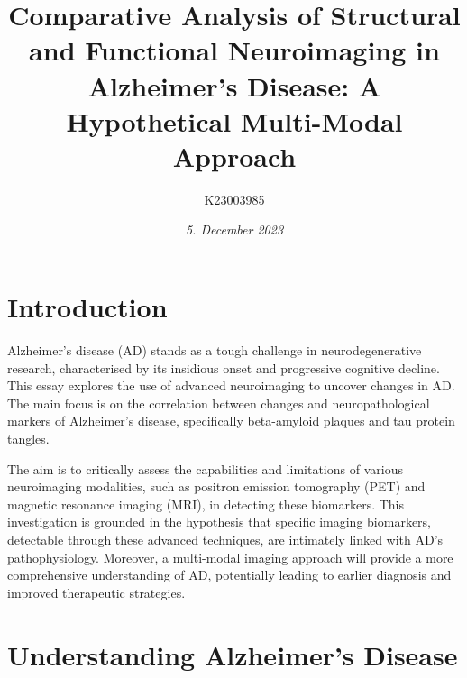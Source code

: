 \documentclass[10pt]{article}
\title{\textbf{Comparative Analysis of Structural and Functional Neuroimaging in Alzheimer's Disease: }A Hypothetical Multi-Modal Approach}
\author[ ]{K23003985}
\date{\textit{5. December 2023}}
\begin{document}

\maketitle

\doublespacing

\begin{sloppypar} %





  \section{Introduction}
  \label{sec:introduction}

  Alzheimer's disease (AD) stands as a tough challenge in neurodegenerative research, characterised by its insidious onset and progressive cognitive decline. This essay explores the use of advanced neuroimaging to uncover changes in AD. The main focus is on the correlation between changes and neuropathological markers of Alzheimer's disease, specifically beta-amyloid plaques and tau protein tangles.

  The aim is to critically assess the capabilities and limitations of various neuroimaging modalities, such as positron emission tomography (PET) and magnetic resonance imaging (MRI), in detecting these biomarkers. This investigation is grounded in the hypothesis that specific imaging biomarkers, detectable through these advanced techniques, are intimately linked with AD's pathophysiology. Moreover, a multi-modal imaging approach will provide a more comprehensive understanding of AD, potentially leading to earlier diagnosis and improved therapeutic strategies.

  \section{Understanding Alzheimer's Disease}
  \label{sec:alzheimers-disease}


\end{sloppypar}
\end{document}
